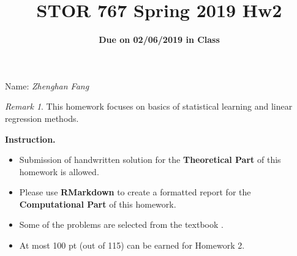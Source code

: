 \documentclass[10pt]{article}
\title{STOR 767 Spring 2019 Hw2}
\subtitle{\textbf{Due on 02/06/2019 in Class}}
\author{}
\date{}
\theoremstyle{definition}
\theoremstyle{remark}
\newtheorem*{rmk}{Remark}
\begin{document}
\maketitle

\begin{center}
    Name: \emph{Zhenghan Fang}
\end{center}


\begin{rmk}
	This homework focuses on basics of statistical learning and linear regression methods. 
\end{rmk}

\noindent \textbf{Instruction.}
\begin{itemize}
	\item Submission of handwritten solution for the \textbf{Theoretical Part} of this homework is allowed.
	
	\item Please use \textbf{RMarkdown} to create a formatted report for the \textbf{Computational Part} of this homework. 

	\item Some of the problems are selected from the textbook \cite{friedman2009elements}.
	
	\item At most 100 pt  (out of 115) can be earned for Homework 2.
\end{itemize}
\end{document}

